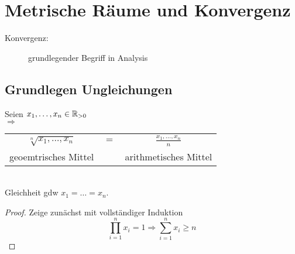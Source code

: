 \part{Metrische Räume und Konvergenz}
\begin{description}
	\item[Konvergenz:] grundlegender Begriff in Analysis %
\end{description}
\chapter{Grundlegen Ungleichungen}

\begin{satz}
	Seien $x_1, \dots, x_n \in \mathbb{R}_{>0}$\\
$\Rightarrow$
	\begin{tabular}{ccc}
		$ \sqrt[n]{x_1, \dots, x_n}$ & $=$ & $\frac{x_1, \dots, x_n}{n}$ \\
		geoemtrisches Mittel &  & arithmetisches Mittel \\
	\end{tabular}\\
Gleichheit gdw $x_1 = \dots = x_n$.
\end{satz}

\begin{proof}
	Zeige zunächst mit vollständiger Induktion\\
	\begin{equation}
	\prod_{i=1}^{n}x_i=1 \Rightarrow \sum_{i=1}^{n} x_i \geq n
	\end{equation}
	\item 
	\QEDA
\end{proof}
